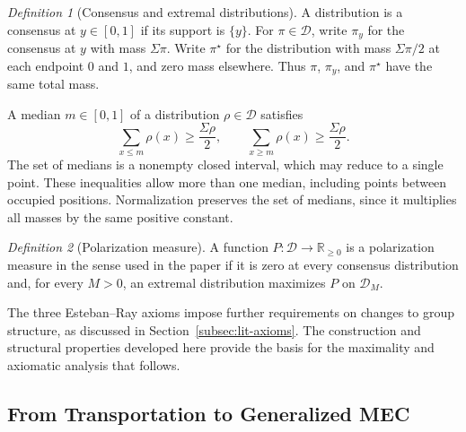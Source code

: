 \documentclass{article}
\theoremstyle{plain}
\theoremstyle{remark}
\newtheorem{definition}{Definition}
\begin{document}
\begin{definition}[Consensus and extremal distributions]\label{def:mec-consensus-extremal}
A distribution is a consensus at $y\in[0,1]$ if its support is $\{y\}$. For $\pi\in\mathcal{D}$, write $\pi_y$ for the consensus at $y$ with mass $\Sigma\pi$. Write $\pi^\star$ for the distribution with mass $\Sigma\pi/2$ at each endpoint $0$ and $1$, and zero mass elsewhere. Thus $\pi$, $\pi_y$, and $\pi^\star$ have the same total mass.
\end{definition}

A median $m\in[0,1]$ of a distribution $\rho\in\mathcal{D}$ satisfies
\[
\sum_{x\leq m}\rho(x)\geq\frac{\Sigma\rho}{2},
\qquad
\sum_{x\geq m}\rho(x)\geq\frac{\Sigma\rho}{2}.
\]
The set of medians is a nonempty closed interval, which may reduce to a single point. These inequalities allow more than one median, including points between occupied positions. Normalization preserves the set of medians, since it multiplies all masses by the same positive constant.

\begin{definition}[Polarization measure]\label{def:mec-polarization-measure}
A function $P\colon\mathcal{D}\to\mathbb{R}_{\geq0}$ is a polarization measure in the sense used in the paper if it is zero at every consensus distribution and, for every $M>0$, an extremal distribution maximizes $P$ on $\mathcal{D}_M$.
\end{definition}
The three Esteban--Ray axioms impose further requirements on changes to group structure, as discussed in Section~\ref{subsec:lit-axioms}. The construction and structural properties developed here provide the basis for the maximality and axiomatic analysis that follows.

\subsection{From Transportation to Generalized MEC}\label{subsec:mec-transport-construction}
\end{document}
